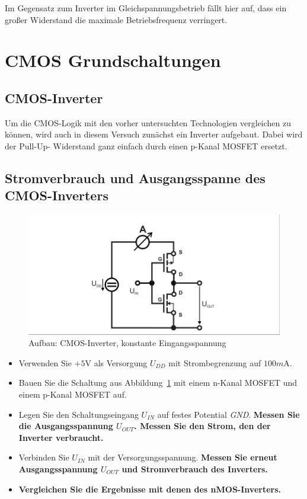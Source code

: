 \documentclass[10pt]{scrreprt}
\begin{document}
    Im Gegensatz zum Inverter im Gleichspannungsbetrieb fällt hier auf, dass ein
    großer Widerstand die maximale Betriebsfrequenz verringert.

    \section{CMOS Grundschaltungen}
    \subsection{CMOS-Inverter}
    Um die CMOS-Logik mit den vorher untersuchten Technologien vergleichen zu können,
    wird auch in diesem Versuch zunächst ein Inverter aufgebaut. Dabei wird der Pull-Up-
    Widerstand ganz einfach durch einen p-Kanal MOSFET ersetzt.

    \subsection{Stromverbrauch und Ausgangsspanne des CMOS-Inverters}
    \begin{figure}[H]
        \includegraphics[width=\textwidth]{abb16.png}
        \caption{Aufbau: CMOS-Inverter, konstante Eingangsspannung}
        \label{fig:abb16}
    \end{figure}
    \begin{itemize}
        \item Verwenden Sie $+5\si{\volt}$ als Versorgung $U_{DD}$ mit Strombegrenzung auf $100\si{m\ampere}$.
        \item Bauen Sie die Schaltung aus Abbildung~\ref{fig:abb16} mit einem n-Kanal MOSFET und einem
            p-Kanal MOSFET auf.
        \item Legen Sie den Schaltungseingang $U_{IN}$ auf festes Potential \textit{GND}. \textbf{Messen Sie die
            Ausgangsspannung $U_{OUT}$. Messen Sie den Strom, den der Inverter verbraucht.}
        \item Verbinden Sie $U_{IN}$ mit der Versorgungsspannung. \textbf{Messen Sie erneut
            Ausgangsspannung $U_{OUT}$ und Stromverbrauch des Inverters.}
        \item \textbf{Vergleichen Sie die Ergebnisse mit denen des nMOS-Inverters.}
    \end{itemize}
\end{document}
